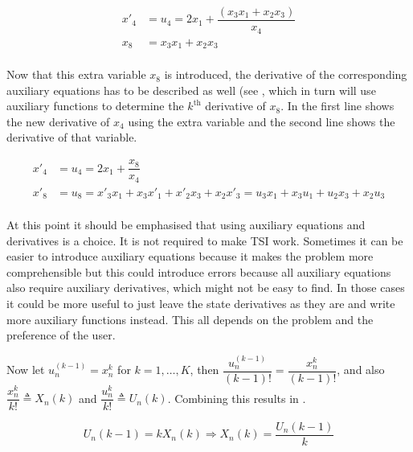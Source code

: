 \begin{equation} \label{eq:auxEqExample}
\begin{split}
x'_{4} &= u_{4} = 2x_{1}+\dfrac{\left(x_{3}x_{1}+x_{2}x_{3}\right)}{x_{4}} \\
x_{8} &= x_{3}x_{1}+x_{2}x_{3} \\
\end{split}
\end{equation}

\noindent
Now that this extra variable $x_{8}$ is introduced, the derivative of the corresponding auxiliary equations has to be described as well (see , which in turn will use auxiliary functions to determine the $k^{\text{th}}$ derivative of $x_{8}$. In  the first line shows the new derivative of $x_{4}$ using the extra variable and the second line shows the derivative of that variable.

\begin{equation} \label{eq:auxDerExample}
\begin{split}
x'_{4} &= u_{4} = 2x_{1}+\dfrac{x_{8}}{x_{4}} \\
x'_{8} &= u_{8} =  x'_{3}x_{1}+x_{3}x'_{1}+x'_{2}x_{3}+x_{2}x'_{3} = u_{3}x_{1}+x_{3}u_{1}+u_{2}x_{3}+x_{2}u_{3} \\
\end{split}
\end{equation}

\noindent
At this point it should be emphasised that using auxiliary equations and derivatives is a choice. It is not required to make \ac{TSI} work. Sometimes it can be easier to introduce auxiliary equations because it makes the problem more comprehensible but this could introduce errors because all auxiliary equations also require auxiliary derivatives, which might not be easy to find. In those cases it could be more useful to just leave the state derivatives as they are and write more auxiliary functions instead. This all depends on the problem and the preference of the user. 

\noindent
Now let $u_{n}^{\left(k-1\right)}=x_{n}^{k}$ for $k=1,\dots,K$, then $\dfrac{u_{n}^{\left(k-1\right)}}{\left(k-1\right)!}=\dfrac{x_{n}^{k}}{\left(k-1\right)!}$, and also $\dfrac{x_{n}^{k}}{k!}\triangleq X_{n}\left(k\right)$ and $\dfrac{u_{n}^{k}}{k!}\triangleq U_{n}\left(k\right)$. Combining this results in .

\begin{equation} \label{eq:def_u}
U_{n}\left(k-1\right)=kX_{n}\left(k\right)\Rightarrow X_{n}\left(k\right)=\dfrac{U_{n}\left(k-1\right)}{k}
\end{equation}

